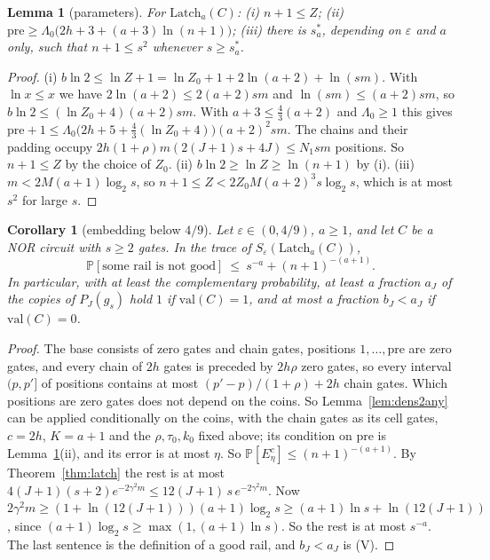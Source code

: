 \documentclass[11pt]{amsart}
\newtheorem{lemma}[theorem]{Lemma}
\newtheorem{corollary}[theorem]{Corollary}
\theoremstyle{definition}
\theoremstyle{remark}
\newcommand{\eps}{\varepsilon}
\newcommand{\val}{\mathrm{val}}
\newcommand{\PP}{\mathbb{P}}
\begin{document}
\begin{lemma}[parameters]\label{lem:param4}
For $\mathrm{Latch}_a(C)$: (i) $n+1\le Z$; (ii)
$\mathrm{pre}\ge\Lambda_0\bigl(2h+3+(a+3)\ln(n+1)\bigr)$; (iii) there is $s^\ast_a$, depending on
$\eps$ and $a$ only, such that $n+1\le s^2$ whenever $s\ge s^\ast_a$.
\end{lemma}

\begin{proof}
(i) $b\ln2\le\ln Z+1=\ln Z_0+1+2\ln(a+2)+\ln(sm)$. With $\ln x\le x$ we have
$2\ln(a+2)\le2(a+2)sm$ and $\ln(sm)\le(a+2)sm$, so $b\ln2\le(\ln Z_0+4)(a+2)sm$. With
$a+3\le\frac43(a+2)$ and $\Lambda_0\ge1$ this gives
$\mathrm{pre}+1\le\Lambda_0\bigl(2h+5+\frac43(\ln Z_0+4)\bigr)(a+2)^2sm$. The chains and their
padding occupy $2h(1+\rho)m(2(J+1)s+4J)\le N_1sm$ positions. So $n+1\le Z$ by the choice of $Z_0$.
(ii) $b\ln2\ge\ln Z\ge\ln(n+1)$ by (i).
(iii) $m<2M(a+1)\log_2s$, so $n+1\le Z<2Z_0M(a+2)^3s\log_2s$, which is at most $s^2$ for large $s$.
\end{proof}

\begin{corollary}[embedding below $4/9$]\label{cor:latch}
Let $\eps\in(0,4/9)$, $a\ge1$, and let $C$ be a NOR circuit with $s\ge2$ gates. In the trace of
$S_\eps(\mathrm{Latch}_a(C))$,
\[
\PP[\text{some rail is not good}]\ \le\ s^{-a}+(n+1)^{-(a+1)} .
\]
In particular, with at least the complementary probability, at least a fraction $a_J$ of the
copies of $P_J(g_s)$ hold $1$ if $\val(C)=1$, and at most a fraction $b_J<a_J$ if $\val(C)=0$.
\end{corollary}

\begin{proof}
The base consists of zero gates and chain gates, positions $1,\dots,\mathrm{pre}$ are zero gates,
and every chain of $2h$ gates is preceded by $2h\rho$ zero gates, so every interval $(p,p']$ of
positions contains at most $(p'-p)/(1+\rho)+2h$ chain gates. Which positions are zero gates does
not depend on the coins. So Lemma~\ref{lem:dens2any} can be applied conditionally on the coins,
with the chain gates as its cell gates, $c=2h$, $K=a+1$ and the $\rho,\tau_0,k_0$ fixed above; its
condition on $\mathrm{pre}$ is Lemma~\ref{lem:param4}(ii), and its error is at most $\eta$. So
$\PP[E_\eta^c]\le(n+1)^{-(a+1)}$. By Theorem~\ref{thm:latch} the rest is at most
$4(J+1)(s+2)e^{-2\gamma^2m}\le12(J+1)\,s\,e^{-2\gamma^2m}$. Now
$2\gamma^2m\ge(1+\ln(12(J+1)))(a+1)\log_2s\ge(a+1)\ln s+\ln(12(J+1))$, since
$(a+1)\log_2s\ge\max(1,(a+1)\ln s)$. So the rest is at most $s^{-a}$. The last sentence is the definition of a good rail, and
$b_J<a_J$ is (V).
\end{proof}
\end{document}
